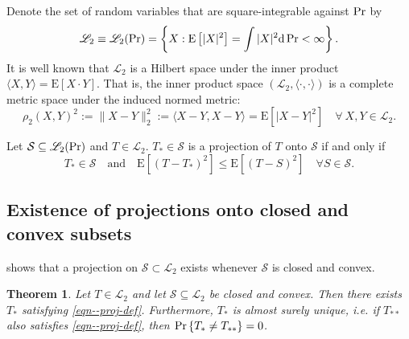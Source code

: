 \documentclass[12pt]{article}
\def\Pr{\mathop{\rm Pr}\nolimits}
\numberwithin{equation}{section}
\theoremstyle{definition}
\theoremstyle{plain}
\newtheorem{theorem}{Theorem}[section]
\begin{document}
Denote the set of random variables that are square-integrable against \(\Pr\) by
\begin{equation}
  \mathscr{L}_{2} \equiv \mathscr{L}_{2} (\Pr) = \left\{ X : \mathrm{E} \left[
  |X|^{2} \right] = \int |X|^{2} \mathrm{d} \Pr < \infty \right\}.
\end{equation}
It is well known that \(\mathscr{L}_{2}\) is a Hilbert space under the
inner product \(\langle X, Y \rangle = \mathrm{E} [X \cdot Y]\).
That is, the inner product space \(\left( \mathscr{L}_{2}, \langle \cdot, \cdot
\rangle \right)\) is a complete metric space under the induced normed metric:
\begin{equation}
  \rho_{2} \left( X, Y \right)^{2} := \|X - Y\|_{2}^{2} := \langle X - Y, X - Y
  \rangle = \mathrm{E} \left[ |X - Y|^{2} \right] \quad \forall \ X, Y \in
  \mathscr{L}_{2}.
\end{equation}

Let \(\mathcal{S} \subseteq \mathscr{L}_{2} (\Pr)\) and \(T \in
\mathscr{L}_{2}\).
\(T_{\ast} \in \mathcal{S}\) is a projection of \(T\) onto \(\mathcal{S}\) if
and only if
\begin{equation}
  T_{\ast} \in \mathcal{S} \quad \text{and} \quad \mathrm{E} \left[ \left( T -
  T_{\ast} \right)^{2} \right] \leq \mathrm{E} \left[ (T - S)^{2} \right] \quad
  \forall S \in \mathcal{S}.
  \label{eqn--proj-def}
\end{equation}

\subsection{Existence of projections onto closed and convex subsets}

 shows that a projection on \(\mathcal{S}
\subset \mathscr{L}_{2}\) exists whenever \(\mathcal{S}\) is closed and convex.

\begin{theorem}
\label{thm--proj-exists-closed-convex}
Let \(T \in \mathscr{L}_{2}\) and let \(\mathcal{S} \subseteq \mathscr{L}_{2}\)
be closed and convex.
Then there exists \(T_{\ast}\) satisfying \eqref{eqn--proj-def}.
Furthermore, \(T_{\ast}\) is almost surely unique, i.e. if \(T_{\ast \ast}\)
also satisfies \eqref{eqn--proj-def}, then \(\Pr \left\{ T_{\ast} \neq T_{\ast
\ast} \right\} = 0\).
\end{theorem}
\end{document}
